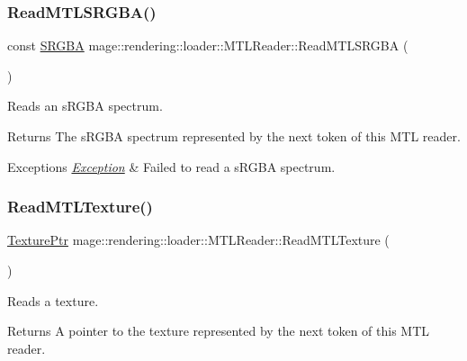 \subsubsection{\texorpdfstring{Read\+M\+T\+L\+S\+R\+G\+B\+A()}{ReadMTLSRGBA()}}
{\footnotesize\ttfamily const \hyperlink{structmage_1_1_s_r_g_b_a}{S\+R\+G\+BA} mage\+::rendering\+::loader\+::\+M\+T\+L\+Reader\+::\+Read\+M\+T\+L\+S\+R\+G\+BA (\begin{DoxyParamCaption}{ }\end{DoxyParamCaption})\hspace{0.3cm}{\ttfamily [private]}}

Reads an s\+R\+G\+BA spectrum.

\begin{DoxyReturn}{Returns}
The s\+R\+G\+BA spectrum represented by the next token of this M\+TL reader. 
\end{DoxyReturn}

\begin{DoxyExceptions}{Exceptions}
{\em \hyperlink{classmage_1_1_exception}{Exception}} & Failed to read a s\+R\+G\+BA spectrum. \\
\hline
\end{DoxyExceptions}
\hypertarget{classmage_1_1rendering_1_1loader_1_1_m_t_l_reader_abf1609fbd22075fa4e692b7b6eab06fd}{}\label{classmage_1_1rendering_1_1loader_1_1_m_t_l_reader_abf1609fbd22075fa4e692b7b6eab06fd} 
\subsubsection{\texorpdfstring{Read\+M\+T\+L\+Texture()}{ReadMTLTexture()}}
{\footnotesize\ttfamily \hyperlink{namespacemage_1_1rendering_a6f3ae54f825328465b0cdde0f0de4a36}{Texture\+Ptr} mage\+::rendering\+::loader\+::\+M\+T\+L\+Reader\+::\+Read\+M\+T\+L\+Texture (\begin{DoxyParamCaption}{ }\end{DoxyParamCaption})\hspace{0.3cm}{\ttfamily [private]}}

Reads a texture.

\begin{DoxyReturn}{Returns}
A pointer to the texture represented by the next token of this M\+TL reader. 
\end{DoxyReturn}

